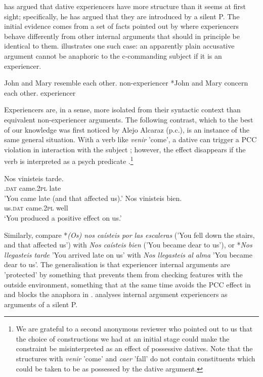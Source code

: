 \documentclass[output=paper,colorlinks,citecolor=brown,nonflat]{./langscibook}
\begin{document}
\citet{Landau2010} has argued that dative experiencers have more structure than it seems at first sight; specifically, he has argued that they are introduced by a silent P. The initial evidence comes from a set of facts pointed out by \citeauthor{Landau2010} where experiencers behave differently from other internal arguments that should in principle be identical to them.  illustrates one such case: an apparently plain accusative argument cannot be anaphoric to the c-commanding subject if it is an experiencer.  

\ea%
    \label{ex:fabregas:29}
    \ea\label{ex:fabregas:29a}
    John and Mary resemble each other. \hfill non-experiencer
    \ex\label{ex:fabregas:29b}
    *John and Mary concern each other. \hfill experiencer
    \z
\z

Experiencers are, in a sense, more isolated from their syntactic context than equivalent non-experiencer arguments. The following contrast, which to the best of our knowledge was first noticed by Alejo Alcaraz (p.c.), is an instance of the same general situation. With a verb like \textit{venir} 'come', a dative can trigger a PCC violation in interaction with the subject ; however, the effect disappears if the verb is interpreted as a psych predicate .\footnote{We are grateful to a second anonymous reviewer who pointed out to us that the choice of constructions we had at an initial stage could make the constraint be misinterpreted as an effect of possessive datives. Note that the structures with \textit{venir} 'come' and \textit{caer} 'fall' do not contain constituents which could be taken to be as possessed by the dative argument.}

\ea%
    \label{ex:fabregas:30}
    \ea\label{ex:fabregas:30a}
    \gll    *Nos     vinisteis   tarde.\\
            \textsc{.dat}   {came.2}\textsc{pl}   {late}\\
    \glt    'You came late (and that affected us).'
    \ex\label{ex:fabregas:30b}
    \gll    Nos     vinisteis     bien.\\
            {us}\textsc{.dat}  {came.2}\textsc{pl}   {well}\\
    \glt `You produced a positive effect on us.'
    \z
\z

Similarly, compare *\textit{(Os) nos caísteis por las escaleras} ('You fell down the stairs, and that affected us') with \textit{Nos caísteis bien} ('You became dear to us'), or *\textit{Nos llegasteis tarde} 'You arrived late on us' with \textit{Nos llegasteis al alma} 'You became dear to us'. The generalisation is that experiencer internal arguments are 'protected' by something that prevents them from checking features with the outside environment, something that at the same time avoids the PCC effect in  and blocks the anaphora in . \citet{Landau2010} analyses internal argument experiencers as arguments of a silent P.
\end{document}
